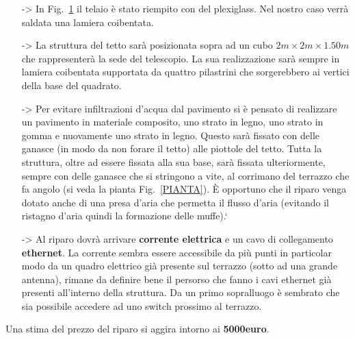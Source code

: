\documentclass[a4paper,12pt]{article}
\begin{document}
\begin{itemize}
\begin{figure}
\begin{subfigure}[b]{0.4\textwidth}
		\caption{Struttura di esempio col tetto aperto e i supporti laterali}
	\end{subfigure}
	\caption{Modalit\`a di riparo con apertura a \textit{fiore}}
	\label{SERR:FIORE}
\end{figure}
	\item[->] In Fig.~\ref{SERR:FIORE} il telaio \`e stato riempito con del plexiglass. Nel nostro caso verr\`a saldata una lamiera coibentata.
	\item[->] La struttura del tetto sar\`a posizionata sopra ad un cubo $2m\times2m\times1.50m$
	      che rappresenter\`a la sede del telescopio. La sua realizzazione sar\`a sempre in lamiera coibentata supportata da quattro pilastrini che sorgerebbero ai vertici della base del quadrato.
      \item[->] Per evitare infiltrazioni d'acqua dal pavimento si \`e pensato di realizzare un pavimento in materiale composito, uno strato in legno, uno strato in gomma e nuovamente uno strato in legno. Questo sar\`a fissato con delle ganasce (in modo da non forare il tetto) alle piottole del tetto. Tutta la struttura, oltre ad essere fissata alla sua base, sar\`a fissata ulteriormente, sempre con delle ganasce che si stringono a vite, al corrimano del terrazzo che fa angolo (si veda la pianta Fig.~\ref{PIANTA}). \`E opportuno che il riparo venga dotato anche di una presa d'aria che permetta il flusso d'aria (evitando il ristagno d'aria quindi la formazione delle muffe).`
      \item[->] Al riparo dovr\`a arrivare \textbf{corrente elettrica} e un cavo di collegamento \textbf{ethernet}. La corrente sembra essere accessibile da pi\`u punti in particolar modo da un quadro elettrico gi\`a presente sul terrazzo (sotto ad una grande antenna), rimane da definire bene il persorso che fanno i cavi ethernet gi\`a presenti all'interno della struttura. Da un primo sopralluogo \`e sembrato che sia possibile accedere ad uno switch prossimo al terrazzo.

\end{itemize}
Una stima del prezzo del riparo si aggira intorno ai \textbf{5000euro}.
\end{document}
